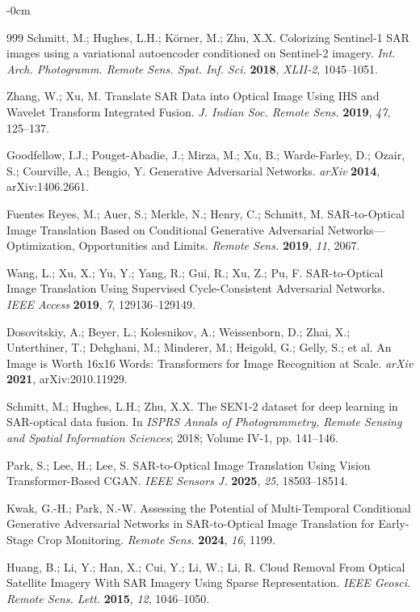 \documentclass[remotesensing,article,submit,pdftex,moreauthors]{Definitions/mdpi}
\begin{document}
\begin{adjustwidth}{-\extralength}{0cm}
\begin{thebibliography}{999}
Schmitt, M.; Hughes, L.H.; Körner, M.; Zhu, X.X. Colorizing Sentinel-1 SAR images using a variational autoencoder conditioned on Sentinel-2 imagery. {\em Int. Arch. Photogramm. Remote Sens. Spat. Inf. Sci.} {\bf 2018}, {\em XLII-2}, 1045--1051.

Zhang, W.; Xu, M. Translate SAR Data into Optical Image Using IHS and Wavelet Transform Integrated Fusion. {\em J. Indian Soc. Remote Sens.} {\bf 2019}, {\em 47}, 125--137.

Goodfellow, I.J.; Pouget-Abadie, J.; Mirza, M.; Xu, B.; Warde-Farley, D.; Ozair, S.; Courville, A.; Bengio, Y. Generative Adversarial Networks. {\em arXiv} {\bf 2014}, arXiv:1406.2661.

Fuentes Reyes, M.; Auer, S.; Merkle, N.; Henry, C.; Schmitt, M. SAR-to-Optical Image Translation Based on Conditional Generative Adversarial Networks—Optimization, Opportunities and Limits. {\em Remote Sens.} {\bf 2019}, {\em 11}, 2067.

Wang, L.; Xu, X.; Yu, Y.; Yang, R.; Gui, R.; Xu, Z.; Pu, F. SAR-to-Optical Image Translation Using Supervised Cycle-Consistent Adversarial Networks. {\em IEEE Access} {\bf 2019}, {\em 7}, 129136--129149.

Dosovitskiy, A.; Beyer, L.; Kolesnikov, A.; Weissenborn, D.; Zhai, X.; Unterthiner, T.; Dehghani, M.; Minderer, M.; Heigold, G.; Gelly, S.; et al. An Image is Worth 16x16 Words: Transformers for Image Recognition at Scale. {\em arXiv} {\bf 2021}, arXiv:2010.11929.

Schmitt, M.; Hughes, L.H.; Zhu, X.X. The SEN1-2 dataset for deep learning in SAR-optical data fusion. In {\em ISPRS Annals of Photogrammetry, Remote Sensing and Spatial Information Sciences}; 2018; Volume IV-1, pp. 141--146.

Park, S.; Lee, H.; Lee, S. SAR-to-Optical Image Translation Using Vision Transformer-Based CGAN. {\em IEEE Sensors J.} {\bf 2025}, {\em 25}, 18503--18514.

Kwak, G.-H.; Park, N.-W. Assessing the Potential of Multi-Temporal Conditional Generative Adversarial Networks in SAR-to-Optical Image Translation for Early-Stage Crop Monitoring. {\em Remote Sens.} {\bf 2024}, {\em 16}, 1199.

Huang, B.; Li, Y.; Han, X.; Cui, Y.; Li, W.; Li, R. Cloud Removal From Optical Satellite Imagery With SAR Imagery Using Sparse Representation. {\em IEEE Geosci. Remote Sens. Lett.} {\bf 2015}, {\em 12}, 1046--1050.


\end{thebibliography}
\end{adjustwidth}
\end{document}
